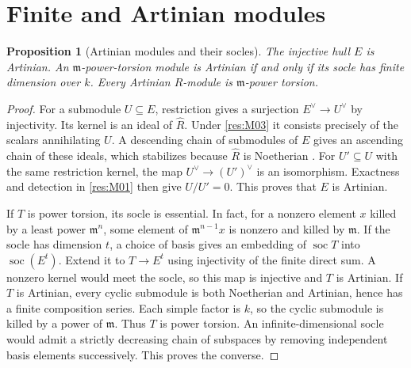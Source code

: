 \documentclass[11pt,oneside,openany]{book}
\newtheorem{proposition}[theorem]{Proposition}
\theoremstyle{definition}
\theoremstyle{remark}
\begin{document}
\section{Finite and Artinian modules}

\begin{proposition}[Artinian modules and their socles]\label{res:M04}
The injective hull $E$ is Artinian. An $\mathfrak m$-power-torsion
module is Artinian if and only if its socle has finite dimension
over $k$. Every Artinian $R$-module is $\mathfrak m$-power torsion.
\end{proposition}
\begin{proof}
For a submodule $U\subseteq E$, restriction gives a surjection
$E^\vee\to U^\vee$ by injectivity. Its kernel is an ideal of
$\widehat R$. Under \ref{res:M03} it consists precisely of the scalars
annihilating $U$. A descending chain of submodules of $E$ gives an
ascending chain of these ideals, which stabilizes because $\widehat R$
is Noetherian \cite[ALG-05-C04-S01]{p103}. For $U'\subseteq U$ with
the same restriction kernel, the map $U^\vee\to (U')^\vee$ is an
isomorphism. Exactness and detection in \ref{res:M01} then give
$U/U'=0$. This proves that $E$ is Artinian.

If $T$ is power torsion, its socle is essential. In fact, for a nonzero
element $x$ killed by a least power $\mathfrak m^n$, some element of
$\mathfrak m^{n-1}x$ is nonzero and killed by $\mathfrak m$. If the
socle has dimension $t$, a choice of basis gives an embedding of
$\operatorname{soc}T$ into $\operatorname{soc}(E^t)$. Extend it to
$T\to E^t$ using injectivity of the finite direct sum. A nonzero kernel
would meet the socle, so this map is injective and $T$ is Artinian.
If $T$ is Artinian, every cyclic submodule is both Noetherian and
Artinian, hence has a finite composition series. Each simple factor
is $k$, so the cyclic submodule is killed by a power of $\mathfrak m$.
Thus $T$ is power torsion. An infinite-dimensional socle would admit
a strictly decreasing chain of subspaces by removing independent basis
elements successively. This proves the converse.
\end{proof}
\end{document}
